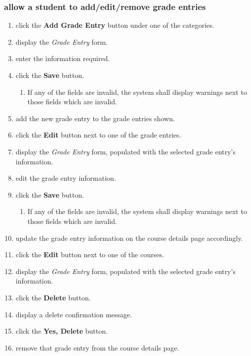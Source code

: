 \documentclass[12pt]{article}
\newenvironment{requirement}[1]
{
    \renewcommand{\thesubsubsection}{R\arabic{subsubsection}.}
    \renewcommand{\labelenumi}{
        \arabic{subsubsection}.\arabic{enumi}
    }
    \renewcommand{\labelenumii}{
        \arabic{subsubsection}.\arabic{enumi}.\arabic{enumii}
    }
    \renewcommand{\labelenumiii}{
        \arabic{subsubsection}.\arabic{enumi}.\arabic{enumii}.\arabic{enumiii}
    }
    \renewcommand{\labelenumiv}{
        \arabic{subsubsection}.\arabic{enumi}.\arabic{enumii}.\arabic{enumiii}.\arabic{enumiv}
    }
    \subsubsection{#1}
    \begin{enumerate}
}
{
    \end{enumerate}
}
\begin{document}
\begin{requirement}{\sysshall allow a student to add/edit/remove grade entries}
    \navcoursedetails
    \item \stushall click the \textbf{Add Grade Entry} button under one of the categories.
    \item \sysshall display the \emph{Grade Entry} form.
    \item \stushall enter the information required.
    \item \stushall click the \textbf{Save} button.
    \begin{enumerate}
        \item If any of the fields are invalid, the system shall display warnings next to those
        fields which are invalid.
    \end{enumerate}
    \item \sysshall add the new grade entry to the grade entries shown.
    \item \stushall click the \textbf{Edit} button next to one of the grade entries.
    \item \sysshall display the \emph{Grade Entry} form, populated with the selected grade entry's
    information.
    \item \stushall edit the grade entry information.
    \item \stushall click the \textbf{Save} button.
    \begin{enumerate}
        \item If any of the fields are invalid, the system shall display warnings next to those
        fields which are invalid.
    \end{enumerate}
    \item \sysshall update the grade entry information on the course details page accordingly.
    \item \stushall click the \textbf{Edit} button next to one of the courses.
    \item \sysshall display the \emph{Grade Entry} form, populated with the selected grade entry's
    information.
    \item \stushall click the \textbf{Delete} button.
    \item \sysshall display a delete confirmation message.
    \item \stushall click the \textbf{Yes, Delete} button.
    \item \sysshall remove that grade entry from the course details page.
    \gotohome
\end{requirement}
\end{document}
